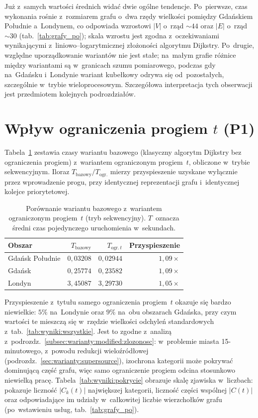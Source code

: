 Już z~samych wartości średnich widać dwie ogólne tendencje. Po~pierwsze,
czas wykonania rośnie z~rozmiarem grafu o~dwa rzędy wielkości pomiędzy
Gdańskiem Południe a~Londynem, co odpowiada wzrostowi $|V|$ o~rząd $\sim 44$
oraz $|E|$ o~rząd $\sim 30$ (tab.~\ref{tab:grafy_po}); skala wzrostu jest
zgodna z~oczekiwaniami wynikającymi z~liniowo--logarytmicznej złożoności
algorytmu Dijkstry. Po~drugie, względne uporządkowanie wariantów nie jest
stałe; na~małym grafie różnice między wariantami są w~granicach szumu
pomiarowego, podczas gdy na~Gdańsku i~Londynie wariant kubełkowy odrywa
się od~pozostałych, szczególnie w~trybie wieloprocesowym. Szczegółowa
interpretacja tych obserwacji jest przedmiotem kolejnych podrozdziałów.

\clearpage

\section{Wpływ ograniczenia progiem $t$ (P1)}
\label{sec:wyniki:p1}

Tabela~\ref{tab:wyniki:p1} zestawia czasy wariantu bazowego (klasyczny algorytm
Dijkstry bez ograniczenia progiem) z~wariantem ograniczonym progiem~$t$,
obliczone w~trybie sekwencyjnym. Iloraz $T_{\text{bazowy}}/T_{\text{ogr.}}$
mierzy przyspieszenie uzyskane wyłącznie przez wprowadzenie progu, przy
identycznej reprezentacji grafu i~identycznej kolejce priorytetowej.

\begin{table}[H]
\centering
\caption{Porównanie wariantu bazowego z~wariantem ograniczonym progiem~$t$
(tryb sekwencyjny). $T$~oznacza średni czas pojedynczego uruchomienia
w~sekundach.}
\label{tab:wyniki:p1}
\begin{tabular}{l r r r}
\hline
\textbf{Obszar} & $T_{\text{bazowy}}$ & $T_{\text{ogr.}\,t}$
& \textbf{Przyspieszenie} \\
\hline
Gdańsk Południe & $0{,}03208$ & $0{,}02944$ & $1{,}09\times$ \\
Gdańsk          & $0{,}25774$ & $0{,}23582$ & $1{,}09\times$ \\
Londyn          & $3{,}45087$ & $3{,}29730$ & $1{,}05\times$ \\
\hline
\end{tabular}
\end{table}

Przyspieszenie z~tytułu samego ograniczenia progiem~$t$ okazuje się
bardzo niewielkie: $5\%$ na~Londynie oraz $9\%$ na~obu obszarach Gdańska,
przy czym wartości te mieszczą się w~rzędzie wielkości odchyleń
standardowych z~tab.~\ref{tab:wyniki:wszystkie}. Jest to zgodne z~analizą
z~podrozdz.~\ref{subsec:warianty:modified:zlozonosc}: w~problemie miasta
15-minutowego, z~powodu redukcji wieloźródłowej (podrozdz.~\ref{sec:warianty:supersource}),
izochrona kategorii może pokrywać dominującą część grafu, więc samo ograniczenie
progiem odcina stosunkowo niewielką pracę.
Tabela~\ref{tab:wyniki:pokrycie} obrazuje skalę zjawiska w~liczbach: pokazuje
liczność $|C_k(t)|$ największej kategorii, liczność części wspólnej $|C(t)|$
oraz odpowiadające im udziały w~całkowitej liczbie wierzchołków grafu
(po~wstawieniu usług, tab.~\ref{tab:grafy_po}).

